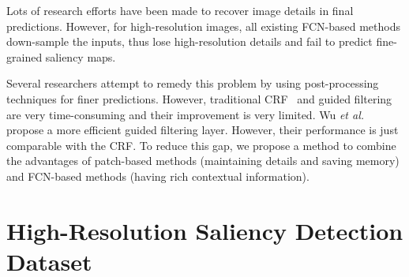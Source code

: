 \documentclass[10pt,twocolumn,letterpaper]{article}
\begin{document}
Lots of research efforts have been made to recover image details in final predictions. However, for high-resolution images, all existing FCN-based methods down-sample the inputs, thus lose high-resolution details and fail to predict fine-grained saliency maps. 

Several researchers attempt to remedy this problem by using post-processing techniques for finer predictions. However, traditional CRF~\cite{krahenbuhl2011efficient} and guided filtering are very time-consuming and their improvement is very limited. Wu \emph{et al.} \cite{wu2018fast} propose a more efficient guided filtering layer. However, their performance is just comparable with the CRF. To reduce this gap, we propose a method to combine the advantages of patch-based methods (maintaining details and saving memory) and FCN-based methods (having rich contextual information).
\section{High-Resolution Saliency Detection Dataset}\label{dataset}
\end{document}
